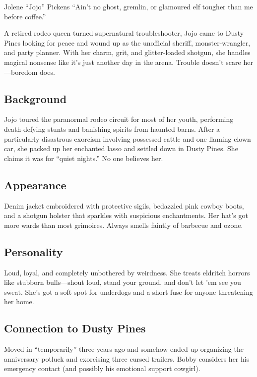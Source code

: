 \newpage
\begin{WyrdCharacterSheet}
    {Jolene “Jojo” Pickens}
    {“Ain’t no ghost, gremlin, or glamoured elf tougher than me before coffee.”}
    \label{pc:jolene-pickens}

    A retired rodeo queen turned supernatural troubleshooter, Jojo came to Dusty Pines looking for peace and wound up as the unofficial sheriff, monster-wrangler, and party planner. With her charm, grit, and glitter-loaded shotgun, she handles magical nonsense like it’s just another day in the arena. Trouble doesn’t scare her—boredom does.

    \subsection{Background}
    Jojo toured the paranormal rodeo circuit for most of her youth, performing death-defying stunts and banishing spirits from haunted barns. After a particularly disastrous exorcism involving possessed cattle and one flaming clown car, she packed up her enchanted lasso and settled down in Dusty Pines. She claims it was for “quiet nights.” No one believes her.

    \subsection{Appearance}
    Denim jacket embroidered with protective sigils, bedazzled pink cowboy boots, and a shotgun holster that sparkles with suspicious enchantments. Her hat’s got more wards than most grimoires. Always smells faintly of barbecue and ozone.

    \subsection{Personality}
    Loud, loyal, and completely unbothered by weirdness. She treats eldritch horrors like stubborn bulls—shout loud, stand your ground, and don’t let ’em see you sweat. She’s got a soft spot for underdogs and a short fuse for anyone threatening her home.

    \subsection{Connection to Dusty Pines}
    Moved in “temporarily” three years ago and somehow ended up organizing the anniversary potluck and exorcising three cursed trailers. Bobby considers her his emergency contact (and possibly his emotional support cowgirl).


\end{WyrdCharacterSheet}
